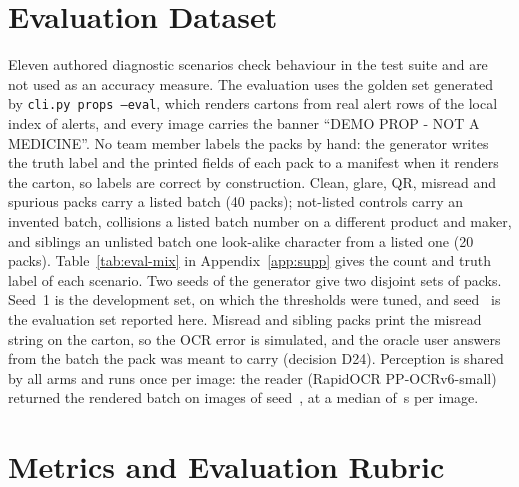 \section{Evaluation Dataset}
\label{sec:eval-evaluation-dataset}

Eleven authored diagnostic scenarios check behaviour in the test suite and are not used as an
accuracy measure. The evaluation uses the golden set generated by \texttt{cli.py props --eval}, which renders
 cartons from real alert rows of the local index of  alerts, and every
image carries the banner ``DEMO PROP - NOT A MEDICINE''. No team member labels the packs by hand:
the generator writes the truth label and the printed fields of each pack to a manifest when it
renders the carton, so labels are correct by construction. Clean, glare, QR, misread and spurious
packs carry a listed batch (40 packs); not-listed controls carry an invented batch, collisions a
listed batch number on a different product and maker, and siblings an unlisted batch one look-alike
character from a listed one (20 packs). Table~\ref{tab:eval-mix} in Appendix~\ref{app:supp} gives
the count and truth label of each scenario. Two seeds
of the generator give two disjoint sets of packs. Seed~1 is the development set, on which the
thresholds were tuned, and seed~ is the evaluation set reported here. Misread and
sibling packs print the misread string on the carton, so the OCR error is simulated, and the oracle
user answers from the batch the pack was meant to carry (decision D24). Perception is shared by all
arms and runs once per image: the reader (RapidOCR PP-OCRv6-small) returned the rendered batch on
 images of seed~, at a median of \,s per image.

\section{Metrics and Evaluation Rubric}
\label{sec:eval-metrics-and-evaluation-rubric}

